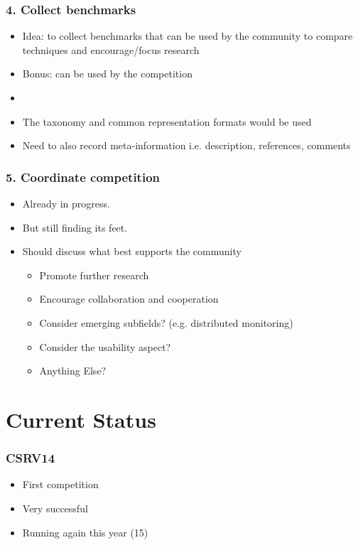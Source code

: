 \documentclass{beamer}
\newcommand{\addhere}{{\color{red} Anything Else?}}
\begin{document}
\begin{frame}
\frametitle{4. Collect benchmarks}
\begin{itemize}
	\item Idea: to collect benchmarks that can be used by the community to compare techniques and encourage/focus research
	\item Bonus: can be used by the competition
	\item[]
	\item The taxonomy and common representation formats would be used
	\item Need to also record meta-information i.e. description, references, comments
\end{itemize}
\end{frame}

\begin{frame}
\frametitle{5. Coordinate competition}
\begin{itemize}
	\item Already in progress.
	\item But still finding its feet.
	\item Should discuss what best supports the community
	\begin{itemize}
		\item Promote further research
		\item Encourage collaboration and cooperation		
		\item Consider emerging subfields? (e.g. distributed monitoring)
		\item Consider the usability aspect?
		\item \addhere{}
	\end{itemize}
\end{itemize}
\end{frame}

\section{Current Status}

\begin{frame}
\frametitle{CSRV14}
\begin{itemize}
	\item First competition
	\item Very successful
	\item Running again this year (15)
\end{itemize}
\end{frame}
\end{document}
